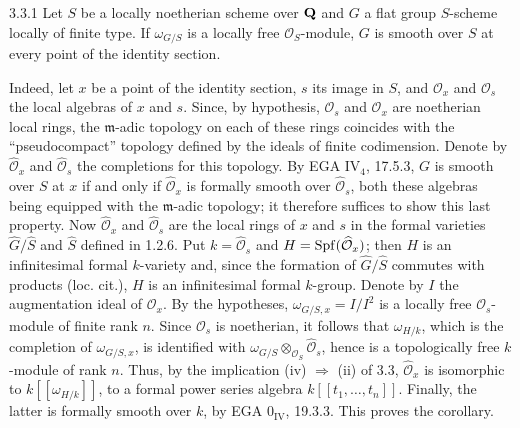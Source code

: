 \begin{corollary}{3.3.1}\label{VIIB.3.3.1}
Let $S$ be a locally noetherian scheme over $\mathbf{Q}$ and $G$ a flat group $S$-scheme locally of finite type. If $\omega_{G/S}$ is a locally free $\mathcal O_S$-module, $G$ is smooth over $S$ at every point of the identity section.
\end{corollary}
Indeed, let $x$ be a point of the identity section, $s$ its image in $S$, and $\mathcal O_x$ and $\mathcal O_s$ the local algebras of $x$ and $s$. Since, by hypothesis, $\mathcal O_s$ and $\mathcal O_x$ are noetherian local rings, the $\mathfrak m$-adic topology on each of these rings coincides with the ``pseudocompact'' topology defined by the ideals of finite codimension. Denote by $\widehat{\mathcal O}_x$ and $\widehat{\mathcal O}_s$ the completions for this topology. By EGA IV$_4$, 17.5.3, $G$ is smooth over $S$ at $x$ if and only if $\widehat{\mathcal O}_x$ is formally smooth over $\widehat{\mathcal O}_s$, both these algebras being equipped with the $\mathfrak m$-adic topology; it therefore suffices to show this last property. Now $\widehat{\mathcal O}_x$ and $\widehat{\mathcal O}_s$ are the local rings of $x$ and $s$ in the formal varieties $\widehat G/\widehat S$ and $\widehat S$ defined in 1.2.6. Put $k=\widehat{\mathcal O}_s$ and $H=\operatorname{Spf}(\widehat{\mathcal O}_x)$; then $H$ is an infinitesimal formal $k$-variety and, since the formation of $\widehat G/\widehat S$ commutes with products (loc. cit.), $H$ is an infinitesimal formal $k$-group. Denote by $I$ the augmentation ideal of $\mathcal O_x$. By the hypotheses, $\omega_{G/S,x}=I/I^2$ is a locally free $\mathcal O_s$-module of finite rank $n$. Since $\mathcal O_s$ is noetherian, it follows that $\omega_{H/k}$, which is the completion of $\omega_{G/S,x}$, is identified with $\omega_{G/S}\otimes_{\mathcal O_S}\widehat{\mathcal O}_s$, hence is a topologically free $k$-module of rank $n$. Thus, by the implication (iv) $\Rightarrow$ (ii) of 3.3, $\widehat{\mathcal O}_x$ is isomorphic to $k[[\omega_{H/k}]]$, \ie to a formal power series algebra $k[[t_1,\ldots,t_n]]$. Finally, the latter is formally smooth over $k$, by EGA 0$_{\mathrm{IV}}$, 19.3.3. This proves the corollary.

